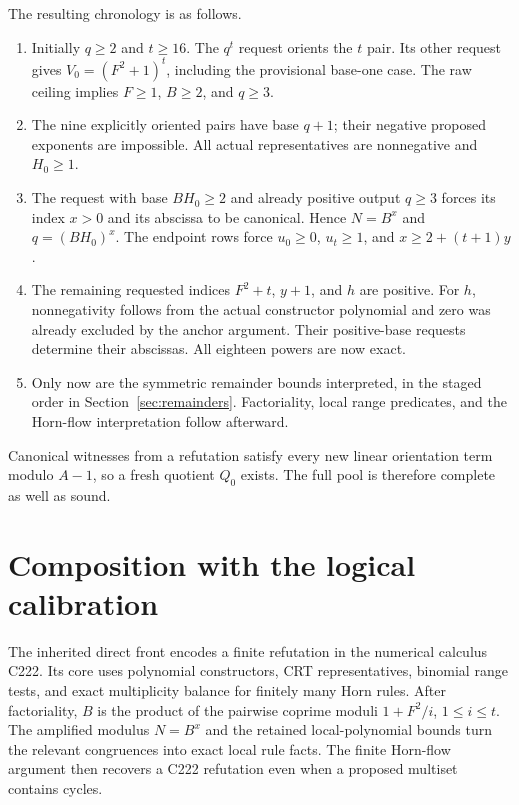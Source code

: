 \documentclass[11pt,letterpaper]{article}
\theoremstyle{definition}\newtheorem{definition}[theorem]{Definition}
\theoremstyle{remark}\newtheorem{remark}[theorem]{Remark}
\begin{document}
The resulting chronology is as follows.
\begin{enumerate}
\item Initially \(q\ge2\) and \(t\ge16\). The \(q^t\) request orients the \(t\) pair. Its other request gives \(V_0=(F^2+1)^t\), including the provisional base-one case. The raw ceiling implies \(F\ge1\), \(B\ge2\), and \(q\ge3\).
\item The nine explicitly oriented pairs have base \(q+1\); their negative proposed exponents are impossible. All actual representatives are nonnegative and \(H_0\ge1\).
\item The request with base \(BH_0\ge2\) and already positive output \(q\ge3\) forces its index \(x>0\) and its abscissa to be canonical. Hence \(N=B^x\) and \(q=(BH_0)^x\). The endpoint rows force \(u_0\ge0\), \(u_t\ge1\), and \(x\ge2+(t+1)y\).
\item The remaining requested indices \(F^2+t\), \(y+1\), and \(h\) are positive. For \(h\), nonnegativity follows from the actual constructor polynomial and zero was already excluded by the anchor argument. Their positive-base requests determine their abscissas. All eighteen powers are now exact.
\item Only now are the symmetric remainder bounds interpreted, in the staged order in Section~\ref{sec:remainders}. Factoriality, local range predicates, and the Horn-flow interpretation follow afterward.
\end{enumerate}
Canonical witnesses from a refutation satisfy every new linear orientation term modulo \(A-1\), so a fresh quotient \(Q_0\) exists. The full pool is therefore complete as well as sound.

\section{Composition with the logical calibration}\label{sec:calibration}

The inherited direct front encodes a finite refutation in the numerical calculus C222. Its core uses polynomial constructors, CRT representatives, binomial range tests, and exact multiplicity balance for finitely many Horn rules. After factoriality, \(B\) is the product of the pairwise coprime moduli \(1+F^2/i\), \(1\le i\le t\). The amplified modulus \(N=B^x\) and the retained local-polynomial bounds turn the relevant congruences into exact local rule facts. The finite Horn-flow argument then recovers a C222 refutation even when a proposed multiset contains cycles.
\end{document}
